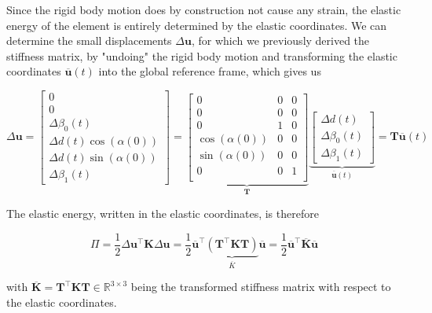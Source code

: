 Since the rigid body motion does by construction not cause any strain, the elastic energy of the element is entirely determined by the elastic coordinates.
We can determine the small displacements $\Delta\boldsymbol{u}$, for which we previously derived the stiffness matrix, by "undoing" the rigid body motion and transforming the elastic coordinates $\overline{\boldsymbol{u}}(t)$ into the global reference frame, which gives us

\begin{equation}
\Delta\boldsymbol{u} = \begin{bmatrix}
0 \\
0 \\
\Delta\beta_0(t) \\
\Delta d(t)\cos(\alpha(0)) \\
\Delta d(t)\sin(\alpha(0)) \\
\Delta\beta_1(t)
\end{bmatrix}
=
\underbrace{
\begin{bmatrix}
0 & 0 & 0 \\
0 & 0 & 0 \\
0 & 1 & 0 \\
\cos(\alpha(0)) & 0 & 0 \\
\sin(\alpha(0)) & 0 & 0 \\
0 & 0 & 1 \\
\end{bmatrix}
}_{\boldsymbol{T}}
\underbrace{
\begin{bmatrix}
\Delta d(t) \\
\Delta \beta_0(t) \\
\Delta \beta_1(t)
\end{bmatrix}
}_{\overline{\boldsymbol{u}}(t)}
=
\boldsymbol{T}\overline{\boldsymbol{u}}(t)
\end{equation}

The elastic energy, written in the elastic coordinates, is therefore

\begin{equation}
\Pi = \frac{1}{2}\Delta\boldsymbol{u}^\intercal\boldsymbol{K}\Delta\boldsymbol{u} = \frac{1}{2}\overline{\boldsymbol{u}}^\intercal\underbrace{\left(\boldsymbol{T}^\intercal\boldsymbol{K}\boldsymbol{T}\right)}_{\overline{K}}\overline{\boldsymbol{u}} = \frac{1}{2}\overline{\boldsymbol{u}}^\intercal\overline{\boldsymbol{K}}\overline{\boldsymbol{u}}
\end{equation}

with $\overline{\boldsymbol{K}} = \boldsymbol{T}^\intercal\boldsymbol{K}\boldsymbol{T} \in \mathbb{R}^{3 \times 3}$ being the transformed stiffness matrix with respect to the elastic coordinates.

